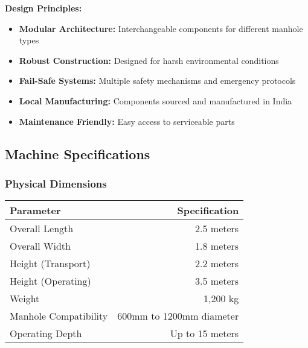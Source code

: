 \documentclass[11pt,a4paper]{article}
\begin{document}
\begin{success}
\textbf{Design Principles:}
\begin{itemize}
    \item \textbf{Modular Architecture:} Interchangeable components for different manhole types
    \item \textbf{Robust Construction:} Designed for harsh environmental conditions
    \item \textbf{Fail-Safe Systems:} Multiple safety mechanisms and emergency protocols
    \item \textbf{Local Manufacturing:} Components sourced and manufactured in India
    \item \textbf{Maintenance Friendly:} Easy access to serviceable parts
\end{itemize}
\end{success}

\subsection{Machine Specifications}

\subsubsection{Physical Dimensions}
\begin{center}
\begin{tabular}{lr}
\toprule
\textbf{Parameter} & \textbf{Specification} \\
\midrule
Overall Length & 2.5 meters \\
Overall Width & 1.8 meters \\
Height (Transport) & 2.2 meters \\
Height (Operating) & 3.5 meters \\
Weight & 1,200 kg \\
Manhole Compatibility & 600mm to 1200mm diameter \\
Operating Depth & Up to 15 meters \\
\bottomrule
\end{tabular}
\end{center}
\end{document}
